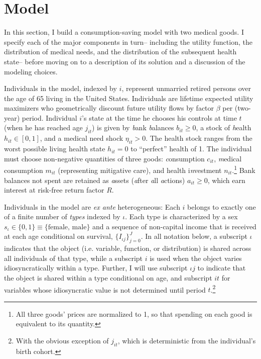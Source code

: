 \documentclass[12pt,pdftex,letterpaper]{article}
\newcommand{\Health}{h}
\newcommand{\Inc}{I}
\newcommand{\Con}{c}
\newcommand{\Care}{m}
\newcommand{\Invst}{n}
\newcommand{\Bank}{b}
\newcommand{\Assets}{a}
\newcommand{\Rfree}{R}
\newcommand{\DiscFac}{\beta}
\newcommand{\Sex}{s}
\newcommand{\MedShk}{\eta}
\begin{document}
\section{Model}
\label{sec:Model}

In this section, I build a consumption-saving model with two medical goods.  I specify each of the major components in turn-- including the utility function, the distribution of medical needs, and the distribution of the subsequent health state-- before moving on to a description of its solution and a discussion of the modeling choices.

Individuals in the model, indexed by $i$, represent unmarried retired persons over the age of 65 living in the United States.  Individuals are lifetime expected utility maximizers who geometrically discount future utility flows by factor $\DiscFac$ per (two-year) period.  Individual $i$'s state at the time he chooses his controls at time $t$ (when he has reached age $j_{it}$) is given by \textit{b}ank \textit{b}alances $\Bank_{it} \geq 0$, a stock of \textit{h}ealth $\Health_{it} \in [0,1]$, and a medical need shock $\MedShk_{it} > 0$.  The health stock ranges from the worst possible living health state $\Health_{it} = 0$ to ``perfect'' health of 1.  The individual must choose non-negative quantities of three goods: \textit{c}onsumption $\Con_{it}$, \textit{m}edical consumption $\Care_{it}$ (representing mitigative care), and health i\textit{n}vestment $\Invst_{it}$.\footnote{All three goods' prices are normalized to 1, so that spending on each good is equivalent to its quantity.} Bank balances not spent are retained as \textit{a}ssets (\textit{a}fter \textit{a}ll \textit{a}ctions) $\Assets_{it} \geq 0$, which earn interest at risk-free return factor $\Rfree$.

Individuals in the model are \textit{ex ante} heterogeneous: Each $i$ belongs to exactly one of a finite number of \textit{types} indexed by $\iota$.  Each type is characterized by a sex $\Sex_\iota \in \{0,1\} \equiv \{\text{female, male}\}$ and a sequence of non-capital income that is received at each age conditional on survival, $\{\Inc_{\iota j}\}_{j=0}^J$.  In all notation below, a subscript $\iota$ indicates that the object (i.e. variable, function, or distribution) is shared across all individuals of that type, while a subscript $i$ is used when the object varies idiosyncratically within a type.  Further, I will use subscript $\iota j$ to indicate that the object is shared within a type conditional on age, and subscript $it$ for variables whose idiosyncratic value is not determined until period $t$.\footnote{With the obvious exception of $j_{it}$, which is deterministic from the individual's birth cohort.}
\end{document}

